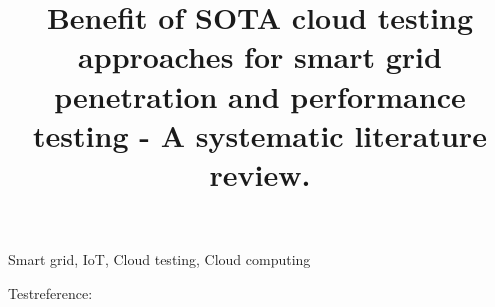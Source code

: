 \documentclass[conference]{biblio/IEEEtran}
\begin{document}
\title{Benefit of SOTA cloud testing approaches for smart grid penetration and performance testing - A systematic literature review.\\}

\author{
}


\maketitle


\begin{IEEEkeywords}
Smart grid, IoT, Cloud testing, Cloud computing
\end{IEEEkeywords}








Testreference: \cite{electronics10091043}




\vspace{12pt}
\end{document}
